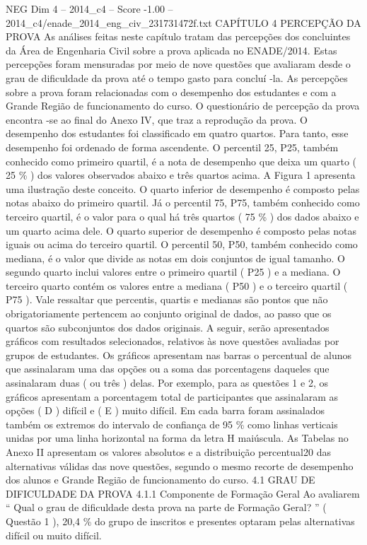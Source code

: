 \begin{textsample}{NEG Dim 4 – 2014\_c4 – Score -1.00 – 2014\_c4/enade\_2014\_eng\_civ\_231731472f.txt}  \label{ex:f4_neg_149}
CAPÍTULO 4 PERCEPÇÃO DA PROVA As análises feitas neste capítulo tratam das percepções dos concluintes da Área de Engenharia Civil sobre a prova aplicada no ENADE/2014.
Estas percepções foram mensuradas por meio de nove questões que avaliaram desde o grau de dificuldade da prova até o tempo gasto para concluí -la.
As percepções sobre a prova foram relacionadas com o desempenho dos estudantes e com a Grande Região de funcionamento do curso.
O questionário de percepção da prova encontra -se ao final do Anexo IV, que traz a reprodução da prova.
O desempenho dos estudantes foi classificado em quatro quartos.
Para tanto, esse desempenho foi ordenado de forma ascendente.
O percentil 25, P25, também conhecido como primeiro quartil, é a nota de desempenho que deixa um quarto ( 25 \% ) dos valores observados abaixo e três quartos acima.
A Figura 1 apresenta uma ilustração deste conceito.
O quarto inferior de desempenho é composto pelas notas abaixo do primeiro quartil.
Já o percentil 75, P75, também conhecido como terceiro quartil, é o valor para o qual há três quartos ( 75 \% ) dos dados abaixo e um quarto acima dele.
O quarto superior de desempenho é composto pelas notas iguais ou acima do terceiro quartil.
O percentil 50, P50, também conhecido como mediana, é o valor que divide as notas em dois conjuntos de igual tamanho.
O segundo quarto inclui valores entre o primeiro quartil ( P25 ) e a mediana.
O terceiro quarto contém os valores entre a mediana ( P50 ) e o terceiro quartil ( P75 ).
Vale ressaltar que percentis, quartis e medianas são pontos que não obrigatoriamente pertencem ao conjunto original de dados, ao passo que os quartos são subconjuntos dos dados originais.
A seguir, serão apresentados gráficos com resultados selecionados, relativos às nove questões avaliadas por grupos de estudantes.
Os gráficos apresentam nas barras o percentual de alunos que assinalaram uma das opções ou a soma das porcentagens daqueles que assinalaram duas ( ou três ) delas.
Por exemplo, para as questões 1 e 2, os gráficos apresentam a porcentagem total de participantes que assinalaram as opções ( D ) difícil e ( E ) muito difícil.
Em cada barra foram assinalados também os extremos do intervalo de confiança de 95 \% como linhas verticais unidas por uma linha horizontal na forma da letra H maiúscula.
As Tabelas no Anexo II apresentam os valores absolutos e a distribuição percentual20 das alternativas válidas das nove questões, segundo o mesmo recorte de desempenho dos alunos e Grande Região de funcionamento do curso. 4.1 GRAU DE DIFICULDADE DA PROVA 4.1.1 Componente de Formação Geral Ao avaliarem “ Qual o grau de dificuldade desta prova na parte de Formação Geral? ” ( Questão 1 ), 20,4 \% do grupo de inscritos e presentes optaram pelas alternativas difícil ou muito difícil.

\end{textsample}
